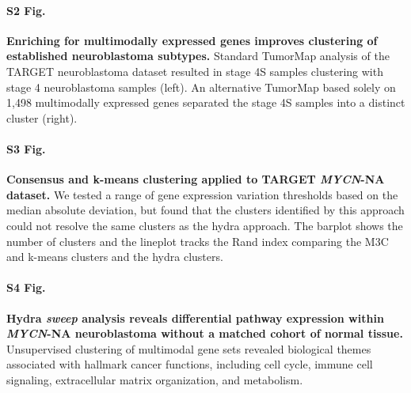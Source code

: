 \documentclass[10pt,letterpaper]{article}
\begin{document}
\paragraph*{S2 Fig.}
\label{S2_Fig}
{\bf Enriching for multimodally expressed genes improves clustering of established neuroblastoma subtypes.} Standard TumorMap analysis of the TARGET neuroblastoma dataset resulted in stage 4S samples clustering with stage 4 neuroblastoma samples (left). An alternative TumorMap based solely on 1,498 multimodally expressed genes separated the stage 4S samples into a distinct cluster (right).

\paragraph*{S3 Fig.}
\label{S3_Fig}
{\bf{Consensus and k-means clustering applied to TARGET \textit{MYCN}-NA dataset.}} We tested a range of gene expression variation thresholds based on the median absolute deviation, but found that the clusters identified by this approach could not resolve the same clusters as the hydra approach. The barplot shows the number of clusters and the lineplot tracks the Rand index comparing the M3C and k-means clusters and the hydra clusters.

\paragraph*{S4 Fig.}
\label{S4_Fig}{\bf Hydra \textit{sweep} analysis reveals differential pathway expression within \textit{MYCN}-NA neuroblastoma without a matched cohort of normal tissue.}
Unsupervised clustering of multimodal gene sets revealed biological themes associated with hallmark cancer functions, including cell cycle, immune cell signaling, extracellular matrix organization, and metabolism.
\end{document}
